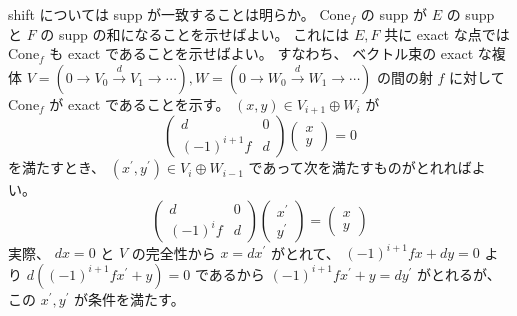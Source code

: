 \documentclass[dvipdfmx]{jsarticle}
\begin{document}
\begin{Proof}
\itemprof
  shift については supp が一致することは明らか。
\itemprof
  \(\text{Cone}_f\) の supp が \(E\) の supp と \(F\) の supp の和になることを示せばよい。
  これには \(E,F\) 共に exact な点では \(\text{Cone}_f\) も exact であることを示せばよい。
  すなわち、 ベクトル束の exact な複体 \(V = (0 \to V_0 \overset{d}{\to} V_1 \to \cdots) , W = (0 \to W_0 \overset{d}{\to} W_1 \to \cdots)\) の間の射 \(f\) に対して \(\text{Cone}_f\) が exact であることを示す。
  \((x,y) \in V_{i+1} \oplus W_{i}\) が
  \[\begin{pmatrix}
    d & 0 \\
    (-1)^{i+1} f & d
  \end{pmatrix} \begin{pmatrix}
    x \\ y
  \end{pmatrix} = 0\] を満たすとき、 \((x^\prime , y^\prime) \in V_{i} \oplus W_{i-1}\) であって次を満たすものがとれればよい。
  \[\begin{pmatrix}
      d & 0 \\
      (-1)^{i} f & d
    \end{pmatrix} \begin{pmatrix}
      x^\prime \\ y^\prime
    \end{pmatrix} = \begin{pmatrix}
      x \\ y
    \end{pmatrix}
  \]
  実際、 \(d x = 0\) と \(V\) の完全性から \(x = d x^\prime\) がとれて、 \((-1)^{i+1} f x + d y = 0\) より \(d ((-1)^{i+1} f x^\prime + y) = 0\) であるから \((-1)^{i+1} f x^\prime + y = d y^\prime\) がとれるが、この \(x^\prime , y^\prime\) が条件を満たす。
\end{Proof}
\end{document}
